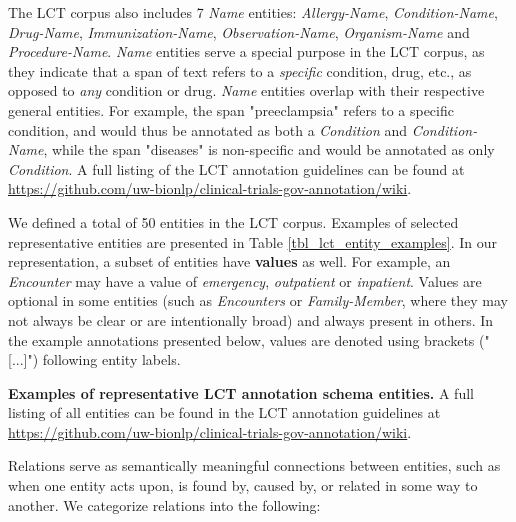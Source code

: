 \documentclass[../main.tex]{subfiles}
\begin{document}
The LCT corpus also includes 7 \textit{Name} entities: \textit{Allergy-Name}, \textit{Condition-Name}, \textit{Drug-Name}, \textit{Immunization-Name}, \textit{Observation-Name}, \textit{Organism-Name} and \textit{Procedure-Name}. \textit{Name} entities serve a special purpose in the LCT corpus, as they indicate that a span of text refers to a \textit{specific} condition, drug, etc., as opposed to \textit{any} condition or drug. \textit{Name} entities overlap with their respective general entities. For example, the span "preeclampsia" refers to a specific condition, and would thus be annotated as both a \textit{Condition} and \textit{Condition-Name}, while the span "diseases" is non-specific and would be annotated as only \textit{Condition}. A full listing of the LCT annotation guidelines can be found at \url{https://github.com/uw-bionlp/clinical-trials-gov-annotation/wiki}.

We defined a total of 50 entities in the LCT corpus. Examples of selected representative entities are presented in Table \ref{tbl_lct_entity_examples}. In our representation, a subset of entities have \textbf{values} as well. For example, an \textit{Encounter} may have a value of \textit{emergency}, \textit{outpatient} or \textit{inpatient}. Values are optional in some entities (such as \textit{Encounters} or \textit{Family-Member}, where they may not always be clear or are intentionally broad) and always present in others. In the example annotations presented below, values are denoted using brackets ("[...]") following entity labels.

\begin{table}
    \footnotesize
    
    \caption{\textbf{Examples of representative LCT annotation schema entities.} A full listing of all entities can be found in the LCT annotation guidelines at \url{https://github.com/uw-bionlp/clinical-trials-gov-annotation/wiki}.}
    \label{tbl_lct_entity_examples}
\end{table} 


Relations serve as semantically meaningful connections between entities, such as when one entity acts upon, is found by, caused by, or related in some way to another. We categorize relations into the following:
\end{document}
